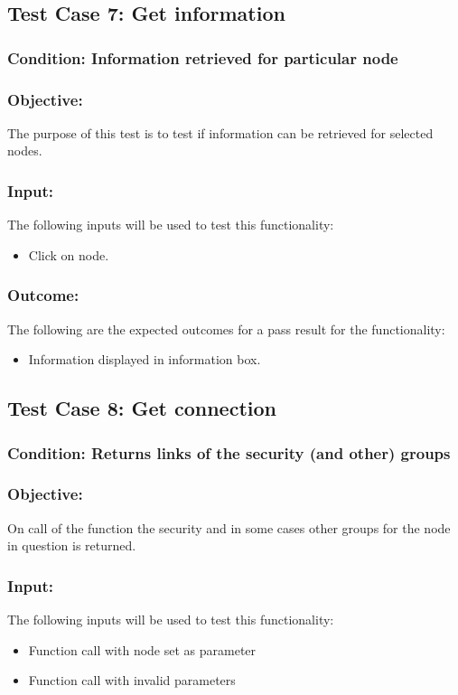 \documentclass[hidelinks,a4paper,12pt]{article}
\begin{document}
\subsection{Test Case 7: Get information }
\subsubsection{Condition: Information retrieved for particular node}
\subsubsection{Objective:} The purpose of this test is to test if information can be retrieved for selected nodes.

\subsubsection{Input:}
 The following inputs will be used to test this functionality:
\begin{itemize}
  \item Click on node.
  

\end{itemize}

\subsubsection{Outcome: }
The following are the expected outcomes for a pass result for the functionality:
\begin{itemize}
\item Information displayed in information box.

\end{itemize}

\subsection{Test Case 8: Get connection }
\subsubsection{Condition: Returns links of the security (and other) groups}
\subsubsection{Objective:} On call of the function the security and in some cases other groups for the node in question is returned. 

\subsubsection{Input:}
The following inputs will be used to test this functionality:
\begin{itemize}
	\item Function call with node set as parameter
	\item Function call with invalid parameters
	
	
\end{itemize}
\end{document}
